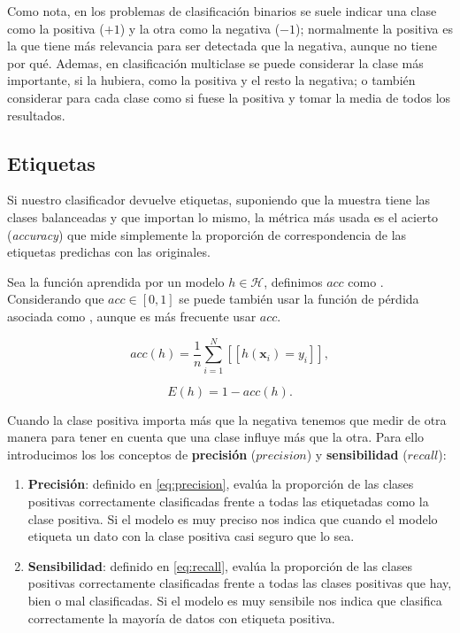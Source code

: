 Como nota, en los problemas de clasificación binarios se suele indicar una clase como la positiva ($+1$) y la otra como la negativa ($-1$); normalmente la positiva es la que tiene más relevancia para ser detectada que la negativa, aunque no tiene por qué. Ademas, en clasificación multiclase se puede considerar la clase más importante, si la hubiera, como la positiva y el resto la negativa; o también considerar para cada clase como si fuese la positiva y tomar la media de todos los resultados.

\subsection{Etiquetas}

Si nuestro clasificador devuelve etiquetas, suponiendo que la muestra tiene las clases balanceadas y que importan lo mismo, la métrica más usada es el acierto (\emph{accuracy}) que mide simplemente la proporción de correspondencia de las etiquetas predichas con las originales.

Sea la función aprendida por un modelo $h \in \mathcal{H}$, definimos $acc$ como . Considerando que $acc \in [0, 1]$ se puede también usar la función de pérdida asociada como , aunque es más frecuente usar $acc$.

\begin{equation}
  acc(h) = \frac{1}{n} \sum \limits^N_{i = 1}[[h(\textbf{x}_i) = y_i]],
  \label{eq:acc}
\end{equation}

\begin{equation}
  E(h) = 1 - acc(h).
  \label{eq:acc_loss}
\end{equation}

Cuando la clase positiva importa más que la negativa tenemos que medir de otra manera para tener en cuenta que una clase influye más que la otra. Para ello introducimos los los conceptos de \textbf{precisión} ($precision$) y \textbf{sensibilidad} ($recall$):

\begin{enumerate}
  \item \textbf{Precisión}: definido en \eqref{eq:precision}, evalúa la proporción de las clases positivas correctamente clasificadas frente a todas las etiquetadas como la clase positiva. Si el modelo es muy preciso nos indica que cuando el modelo etiqueta un dato con la clase positiva casi seguro que lo sea.
  \item \textbf{Sensibilidad}: definido en \eqref{eq:recall}, evalúa la proporción de las clases positivas correctamente clasificadas frente a todas las clases positivas que hay, bien o mal clasificadas. Si el modelo es muy sensibile nos indica que clasifica correctamente la mayoría de datos con etiqueta positiva.
\end{enumerate}

